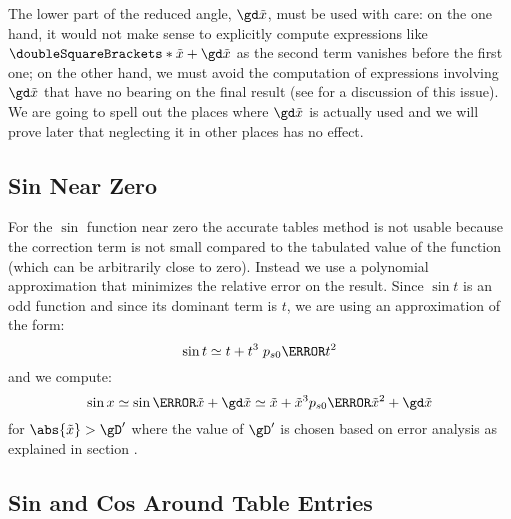 \documentclass[10pt, a4paper, twoside]{basestyle}
\newcommand{\round}[1]{\doubleSquareBrackets*{#1}}
\newcommand{\red}[1]{\tilde{#1}}
\begin{document}
The lower part of the reduced angle, $\gd \red x$, must be used with care: on the one hand, it would not make sense to explicitly compute expressions like $\round{\red x + \gd \red x}$ as the second term vanishes before the first one; on the other hand, we must avoid the computation of expressions involving $\gd \red x$ that have no bearing on the final result (see \cite[402-404]{MullerBrisebarreDeDinechinJeannerodLefevreMelquiondRevolStehleTorres2010} for a discussion of this issue).  We are going to spell out the places where $\gd \red x$ is actually used and we will prove later that neglecting it in other places has no effect.

\subsection*{Sin Near Zero}

For the $\sin$ function near zero the accurate tables method is not usable because the correction term is not small compared to the tabulated value of the function (which can be arbitrarily close to zero).  Instead we use a polynomial approximation that minimizes the relative error on the result.  Since $\sin t$ is an odd function and since its dominant term is $t$, we are using an approximation of the form:
\[
\sin t \simeq t + t^3 \; p_{s0}\of{t^2}
\]
and we compute:
\[
\sin x \simeq \sin\of{\red x + \gd \red x} \simeq \red x + {\red x}^3 p_{s0}\of{{\red x}^2} + \gd \red x
\]
for $\abs{\red x} > \gD'$ where the value of $\gD'$ is chosen based on error analysis as explained in section .

\subsection*{Sin and Cos Around Table Entries}
\end{document}
